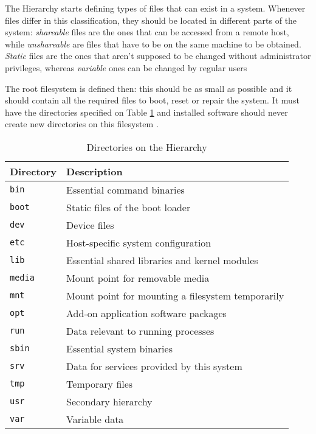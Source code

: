 The Hierarchy starts defining types of files that can exist in a system. Whenever files differ in this classification, they should be located in different parts of the system: \textit{shareable} files are the ones that can be accessed from a remote host, while \textit{unshareable} are files that have to be on the same machine to be obtained. \textit{Static} files are the ones that aren't supposed to be changed without administrator privileges, whereas \textit{variable} ones can be changed by regular users \cite{allbery2015filesystem}

The root filesystem is defined then: this should be as small as possible and it should contain all the required files to boot, reset or repair the system. It must have the directories specified on Table \ref{tab:directories} and installed software should never create new directories on this filesystem \cite{allbery2015filesystem}.


\begin{table}[h!]
\centering
\caption{Directories on the Hierarchy \cite{allbery2015filesystem}}
\label{tab:directories}
\begin{tabular}{ll}
\toprule
\textbf{Directory} & \textbf{Description} \\
\midrule
\texttt{bin} & Essential command binaries \\
\texttt{boot} & Static files of the boot loader \\
\texttt{dev} & Device files \\
\texttt{etc} & Host-specific system configuration \\
\texttt{lib} & Essential shared libraries and kernel modules \\
\texttt{media} & Mount point for removable media \\
\texttt{mnt} & Mount point for mounting a filesystem temporarily \\
\texttt{opt} & Add-on application software packages \\
\texttt{run} & Data relevant to running processes \\
\texttt{sbin} & Essential system binaries \\
\texttt{srv} & Data for services provided by this system \\
\texttt{tmp} & Temporary files \\
\texttt{usr} & Secondary hierarchy \\
\texttt{var} & Variable data \\
\bottomrule
\end{tabular}
\end{table}


